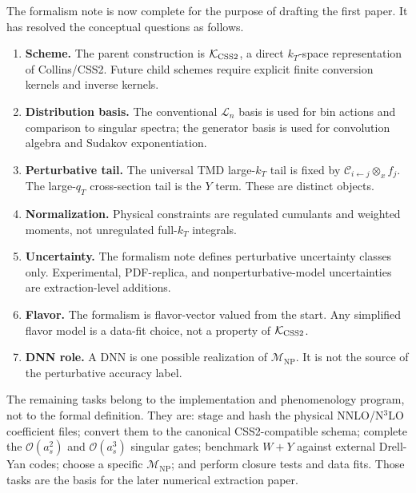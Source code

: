 \documentclass[11pt]{article}
\newcommand{\ox}{\otimes_x}
\newcommand{\order}[1]{\mathcal{O}\!\left(#1\right)}
\newcommand{\NP}{\mathrm{NP}}
\newcommand{\KCSS}{\mathcal K_{\rm CSS2}}
\begin{document}
The formalism note is now complete for the purpose of drafting the first paper.  It has
resolved the conceptual questions as follows.
\begin{enumerate}
  \item \textbf{Scheme.}  The parent construction is $\KCSS$, a direct $k_T$-space
  representation of Collins/CSS2.  Future child schemes require explicit finite
  conversion kernels and inverse kernels.

  \item \textbf{Distribution basis.}  The conventional $\mathcal L_n$ basis is used for
  bin actions and comparison to singular spectra; the generator basis is used for
  convolution algebra and Sudakov exponentiation.

  \item \textbf{Perturbative tail.}  The universal TMD large-$k_T$ tail is fixed by
  $\mathcal C_{i\leftarrow j}\ox f_j$.  The large-$q_T$ cross-section tail is the
  $Y$ term.  These are distinct objects.

  \item \textbf{Normalization.}  Physical constraints are regulated cumulants and
  weighted moments, not unregulated full-$k_T$ integrals.

  \item \textbf{Uncertainty.}  The formalism note defines perturbative uncertainty
  classes only.  Experimental, PDF-replica, and nonperturbative-model uncertainties are
  extraction-level additions.

  \item \textbf{Flavor.}  The formalism is flavor-vector valued from the start.  Any
  simplified flavor model is a data-fit choice, not a property of $\KCSS$.

  \item \textbf{DNN role.}  A DNN is one possible realization of $\mathcal M_{\NP}$.
  It is not the source of the perturbative accuracy label.
\end{enumerate}

The remaining tasks belong to the implementation and phenomenology program, not to the
formal definition.  They are: stage and hash the physical NNLO/N$^3$LO coefficient files;
convert them to the canonical CSS2-compatible schema; complete the $\order{a_s^2}$ and
$\order{a_s^3}$ singular gates; benchmark $W+Y$ against external Drell-Yan codes; choose a
specific $\mathcal M_{\NP}$; and perform closure tests and data fits.  Those tasks are the
basis for the later numerical extraction paper.
\end{document}
